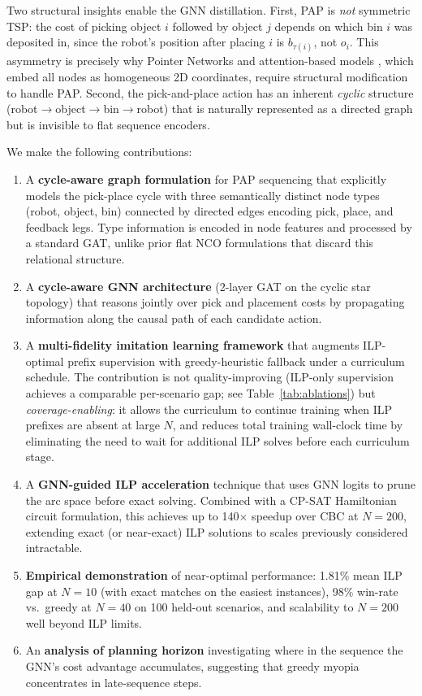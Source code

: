 \documentclass[conference]{IEEEtran}
\begin{document}
Two structural insights enable the GNN distillation. First, PAP is \emph{not} symmetric TSP: the cost of picking object $i$ followed by object $j$ depends on which bin $i$ was deposited in, since the robot's position after placing $i$ is $b_{\tau(i)}$, not $o_i$. This asymmetry is precisely why Pointer Networks \cite{vinyals2015pointer} and attention-based models \cite{kool2019attention}, which embed all nodes as homogeneous 2D coordinates, require structural modification to handle PAP. Second, the pick-and-place action has an inherent \emph{cyclic} structure (robot$\to$object$\to$bin$\to$robot) that is naturally represented as a directed graph but is invisible to flat sequence encoders.

We make the following contributions:
\begin{enumerate}
    \item A \textbf{cycle-aware graph formulation} for PAP sequencing that explicitly models the pick-place cycle with three semantically distinct node types (robot, object, bin) connected by directed edges encoding pick, place, and feedback legs. Type information is encoded in node features and processed by a standard GAT, unlike prior flat NCO formulations that discard this relational structure.
    \item A \textbf{cycle-aware GNN architecture} (2-layer GAT on the cyclic star topology) that reasons jointly over pick and placement costs by propagating information along the causal path of each candidate action.
    \item A \textbf{multi-fidelity imitation learning framework} that augments ILP-optimal prefix supervision with greedy-heuristic fallback under a curriculum schedule. The contribution is not quality-improving (ILP-only supervision achieves a comparable per-scenario gap; see Table~\ref{tab:ablations}) but \emph{coverage-enabling}: it allows the curriculum to continue training when ILP prefixes are absent at large $N$, and reduces total training wall-clock time by eliminating the need to wait for additional ILP solves before each curriculum stage.
    \item A \textbf{GNN-guided ILP acceleration} technique that uses GNN logits to prune the arc space before exact solving. Combined with a CP-SAT Hamiltonian circuit formulation, this achieves up to 140$\times$ speedup over CBC at $N{=}200$, extending exact (or near-exact) ILP solutions to scales previously considered intractable.
    \item \textbf{Empirical demonstration} of near-optimal performance: 1.81\% mean ILP gap at $N{=}10$ (with exact matches on the easiest instances), 98\% win-rate vs.\ greedy at $N{=}40$ on 100 held-out scenarios, and scalability to $N{=}200$ well beyond ILP limits.
    \item An \textbf{analysis of planning horizon} investigating where in the sequence the GNN's cost advantage accumulates, suggesting that greedy myopia concentrates in late-sequence steps.
\end{enumerate}
\end{document}
